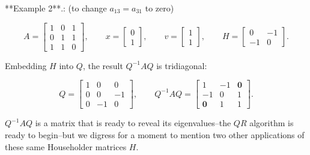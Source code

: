 

**Example 2**.: (to change \(a_{13}=a_{31}\) to zero)

\[A=\begin{bmatrix}1&0&1\\ 0&1&1\\ 1&1&0\end{bmatrix},\qquad x=\begin{bmatrix}0\\ 1\end{bmatrix},\qquad v=\begin{bmatrix}1\\ 1\end{bmatrix},\qquad H=\begin{bmatrix}0&-1\\ -1&0\end{bmatrix}.\]

Embedding \(H\) into \(Q\), the result \(Q^{-1}AQ\) is tridiagonal:

\[Q=\begin{bmatrix}1&0&0\\ 0&0&-1\\ 0&-1&0\end{bmatrix},\qquad Q^{-1}AQ=\begin{bmatrix}1&-1&\mathbf{0}\\ -1&0&1\\ \mathbf{0}&1&1\end{bmatrix}.\]

\(Q^{-1}AQ\) is a matrix that is ready to reveal its eigenvalues--the \(QR\) algorithm is ready to begin--but we digress for a moment to mention two other applications of these same Householder matrices \(H\).

